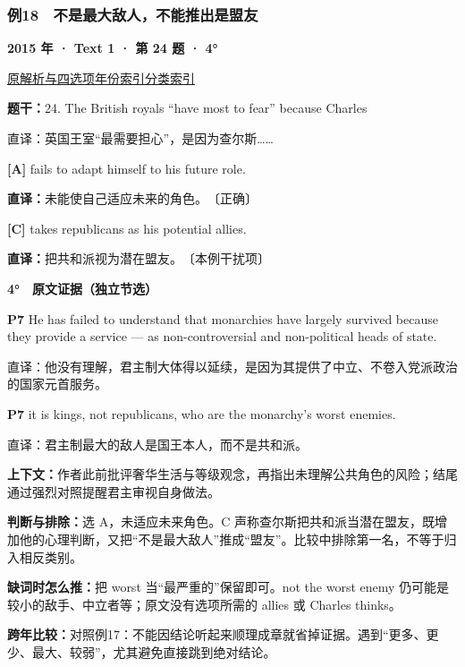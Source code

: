 \documentclass[11pt,a4paper]{article}
\begin{document}
\subsubsection{例18　不是最大敌人，不能推出是盟友}\label{case-2015-T1-Q24}
\noindent\textbf{2015 年 · Text 1 · 第 24 题 · 4°}\par\noindent \href{https://zj139.github.io/math-notes/english/bd84b09056a8e650262124b0/\#q24}{原解析与四选项}\quad \hyperref[idx-2015-T1-Q24]{年份索引}\quad \hyperref[class-R09]{分类索引}\par\smallskip
\noindent\textbf{题干：}24. The British royals “have most to fear” because Charles\par
直译：英国王室“最需要担心”，是因为查尔斯……\par
{}\noindent\textbf{[A]} fails to adapt himself to his future role.\par\nopagebreak
\noindent\textbf{直译：}未能使自己适应未来的角色。　〔正确〕\par
{}\noindent\textbf{[C]} takes republicans as his potential allies.\par\nopagebreak
\noindent\textbf{直译：}把共和派视为潜在盟友。　〔本例干扰项〕\par
\begin{evidence}\textbf{4°　原文证据（独立节选）}\par
\textbf{P7} He has failed to understand that monarchies have largely survived because they provide a service — as non-controversial and non-political heads of state.\par 直译：他没有理解，君主制大体得以延续，是因为其提供了中立、不卷入党派政治的国家元首服务。\par
\textbf{P7} it is kings, not republicans, who are the monarchy's worst enemies.\par 直译：君主制最大的敌人是国王本人，而不是共和派。\par
\end{evidence}
\noindent\textbf{上下文：}作者此前批评奢华生活与等级观念，再指出未理解公共角色的风险；结尾通过强烈对照提醒君主审视自身做法。\par
\noindent\textbf{判断与排除：}选 A，未适应未来角色。C 声称查尔斯把共和派当潜在盟友，既增加他的心理判断，又把“不是最大敌人”推成“盟友”。比较中排除第一名，不等于归入相反类别。\par
\noindent\textbf{缺词时怎么推：}把 worst 当“最严重的”保留即可。not the worst enemy 仍可能是较小的敌手、中立者等；原文没有选项所需的 allies 或 Charles thinks。\par
\noindent\textbf{跨年比较：}对照例17：不能因结论听起来顺理成章就省掉证据。遇到“更多、更少、最大、较弱”，尤其避免直接跳到绝对结论。\par
\clearpage
\end{document}
